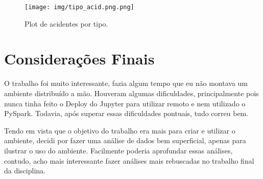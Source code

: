 \documentclass{article}
\begin{document}
\begin{figure}[h]
  \texttt{[image: img/tipo\_acid.png.png]}
  \caption{Plot de acidentes por tipo.}
  \label{fig:df_acid_type}
\end{figure}

\section{Considerações Finais}

O trabalho foi muito interessante, fazia algum tempo que eu não montava um ambiente distribuído a mão. Houveram algumas dificuldades, principalmente pois nunca tinha feito o Deploy do Jupyter para utilizar remoto e nem utilizado o PySpark. Todavia, após superar essas dificuldades pontuais, tudo correu bem.

Tendo em vista que o objetivo do trabalho era mais para criar e utilizar o ambiente, decidi por fazer uma análise de dados bem superficial, apenas para ilustrar o uso do ambiente. Facilmente poderia aprofundar essas análises, contudo, acho mais interessante fazer análises mais rebuscadas no trabalho final da disciplina.
\end{document}
